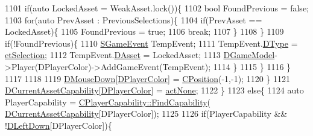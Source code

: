 \begin{DoxyCode}
1101                         \textcolor{keywordflow}{if}(\textcolor{keyword}{auto} LockedAsset = WeakAsset.lock())\{
1102                             \textcolor{keywordtype}{bool} FoundPrevious = \textcolor{keyword}{false};
1103                             \textcolor{keywordflow}{for}(\textcolor{keyword}{auto} PrevAsset : PreviousSelections)\{
1104                                 \textcolor{keywordflow}{if}(PrevAsset == LockedAsset)\{
1105                                     FoundPrevious = \textcolor{keyword}{true};
1106                                     \textcolor{keywordflow}{break};
1107                                 \}
1108                             \}
1109                             \textcolor{keywordflow}{if}(!FoundPrevious)\{
1110                                 \hyperlink{structSGameEvent}{SGameEvent} TempEvent;
1111                                 TempEvent.\hyperlink{structSGameEvent_afa10562e243f4ac2b473b655cc58fee7}{DType} = \hyperlink{GameModel_8h_abfcf510bafec7c6429906a6ecaac656da38393c2ecd9404ab15f2f9bb5aab0497}{etSelection};
1112                                 TempEvent.\hyperlink{structSGameEvent_a40c85eeac83b96887b7449c9bdc5d624}{DAsset} = LockedAsset;
1113                                 \hyperlink{classCApplicationData_a32b50c7c1cbac3cfd67c7f775b1d6fee}{DGameModel}->Player(DPlayerColor)->AddGameEvent(TempEvent);
1114                             \}
1115                         \}
1116                     \}
1117                     
1118                 
1119                     \hyperlink{classCApplicationData_ad7a43a29e7906e44f09347850796a915}{DMouseDown}[\hyperlink{classCApplicationData_a53550939b20cba70570f113e4d1c5d02}{DPlayerColor}] = \hyperlink{classCPosition}{CPosition}(-1,-1);
1120                 \}
1121                 \hyperlink{classCApplicationData_a7e0dbfdc54f73dfa9838ae81b8017e2d}{DCurrentAssetCapability}[\hyperlink{classCApplicationData_a53550939b20cba70570f113e4d1c5d02}{DPlayerColor}] = 
      \hyperlink{GameDataTypes_8h_a35b98ce26aca678b03c6f9f76e4778ceaa8df154ad276f6f62054e9b5b0696f92}{actNone};
1122             \}
1123             \textcolor{keywordflow}{else}\{
1124                 \textcolor{keyword}{auto} PlayerCapability = \hyperlink{classCPlayerCapability_a881ba4b87385d7cfe5cb6ced2d26f226}{CPlayerCapability::FindCapability}(
      \hyperlink{classCApplicationData_a7e0dbfdc54f73dfa9838ae81b8017e2d}{DCurrentAssetCapability}[DPlayerColor]); 
1125                 
1126                 \textcolor{keywordflow}{if}(PlayerCapability && !\hyperlink{classCApplicationData_a2b943f18557c3e4c8cd4550e22e028b6}{DLeftDown}[DPlayerColor])\{

\end{DoxyCode}
